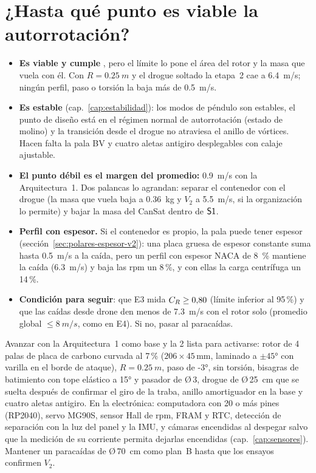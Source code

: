 \section*{¿Hasta qué punto es viable la autorrotación?}
\begin{itemize}
  \item \textbf{Es viable y cumple }, pero el límite lo pone el área del rotor y la masa que
        vuela con él. Con $R=\SI{0.25}{m}$ y el drogue soltado la etapa~2 cae a
        \SI{6.4}{m/s}; ningún perfil, paso o torsión la baja más de \SI{0.5}{m/s}.
  \item \textbf{Es estable} (cap.~\ref{cap:estabilidad}): los modos de péndulo son estables, el
        punto de diseño está en el régimen normal de autorrotación (estado de molino) y la
        transición desde el drogue no atraviesa el anillo de vórtices. Hacen falta la pala BV y
        cuatro aletas antigiro desplegables con calaje ajustable.
  \item \textbf{El punto débil es el margen del promedio:} \SI{0.9}{m/s} con la Arquitectura~1.
        Dos palancas lo agrandan: separar el contenedor con el drogue (la masa que vuela baja a
        \SI{0.36}{kg} y $V_2$ a \SI{5.5}{m/s}, si la organización lo permite) y bajar la masa del
        CanSat dentro de $\textsf{S1}$.
  \item \textbf{Perfil con espesor.} Si el contenedor es propio, la pala puede tener espesor
        (sección~\ref{sec:polares-espesor-v2}): una placa gruesa de espesor constante suma hasta \SI{0.5}{m/s} a la caída, pero un perfil con espesor NACA de
        \SI{8}{\percent} mantiene la caída (\SI{6.3}{m/s}) y baja las rpm un 8\,\%, y con ellas la carga centrífuga un 14\,\%.
  \item \textbf{Condición para seguir}: que E3 mida $C_{R}\ge0{,}80$ (límite inferior al 95\,\%) y que las caídas desde drone den
        menos de \SI{7.3}{m/s} con el rotor solo (promedio global $\le\SI{8}{m/s}$, como en E4). Si no, pasar al paracaídas.
\end{itemize}

\begin{resultado}[Recomendación]
Avanzar con la Arquitectura~1 como base y la 2 lista para activarse: rotor de 4 palas de placa de
carbono curvada al 7\,\% ($206\times45$\,mm, laminado a $\pm\ang{45}$ con varilla en el borde de
ataque), $R=\SI{0.25}{m}$, paso de \ang{-3}, sin torsión, bisagras de batimiento con tope
elástico a \ang{+15} y pasador de Ø\,3, drogue de Ø\,\SI{25}{cm} que se suelta después de
confirmar el giro de la traba, anillo amortiguador en la base y cuatro aletas antigiro. En la
electrónica: computadora con 20 o más pines (RP2040), servo MG90S, sensor Hall de rpm, FRAM y RTC,
detección de separación con la luz del panel y la IMU, y cámaras encendidas al despegar salvo
que la medición de su corriente permita dejarlas encendidas (cap.~\ref{cap:sensores}). Mantener un
paracaídas de Ø\,\SI{70}{cm} como plan~B hasta que los ensayos confirmen $V_2$.
\end{resultado}

